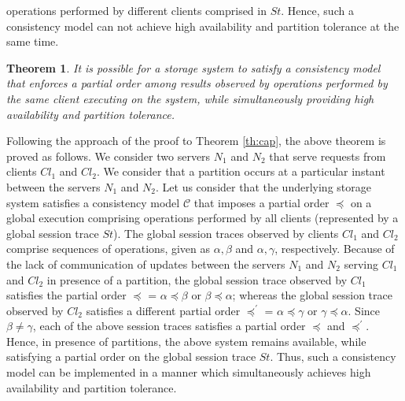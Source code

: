 \documentclass{sig-alternate-05-2015}
\newtheorem {theorem} {Theorem}
\begin{document}
operations performed by different clients  comprised in $\mathit{St}$.  Hence, such a consistency model can not achieve high availability and partition tolerance at the same time. 
 \begin{theorem}
 It is possible for a storage system to satisfy a consistency model that enforces a partial order among results observed by operations performed by the same client executing on the system, while simultaneously providing high availability and partition tolerance.
 \end{theorem}
Following the approach of the proof to Theorem \ref{th:cap}, the above theorem is proved as follows. We consider two servers $N_1$ and $N_2$ that serve requests from clients  $\mathit{Cl}_1$ and $\mathit{Cl}_2$. We consider that a partition occurs at a particular instant between the servers $N_1$ and $N_2$. 
Let us consider that the underlying storage system satisfies a consistency model $\mathcal{C}$ that imposes a partial order $\preccurlyeq$ on a global execution comprising operations performed by all clients (represented by a global session trace $\mathit{St}$).  %
 The global session traces observed by clients $\mathit{Cl}_1$ and $\mathit{Cl}_2$ comprise sequences of operations, given as  $\alpha, \beta$ and  $\alpha, \gamma$, respectively. Because of the lack of communication of updates between the servers $N_1$ and $N_2$ serving $\mathit{Cl}_1$ and $\mathit{Cl}_2$ in presence of a partition, the global session trace observed by $\mathit{Cl}_1$  satisfies the partial order  $\preccurlyeq$ = $\alpha  \preccurlyeq \beta$ or $\beta  \preccurlyeq \alpha$; whereas the global session trace observed by $\mathit{Cl}_2$ satisfies a different partial order $\preccurlyeq^{'}$ = $\alpha \preccurlyeq \gamma$ or $ \gamma \preccurlyeq \alpha$.  Since $\beta \not= \gamma$, each of the above session traces satisfies a partial order $\preccurlyeq$ and  $\preccurlyeq^{'}$. Hence, in presence of partitions, the above system remains available, while satisfying a partial order on the global session trace $\mathit{St}$. Thus, such a consistency model can be implemented in a manner which simultaneously achieves high availability and partition tolerance.  
\end{document}
